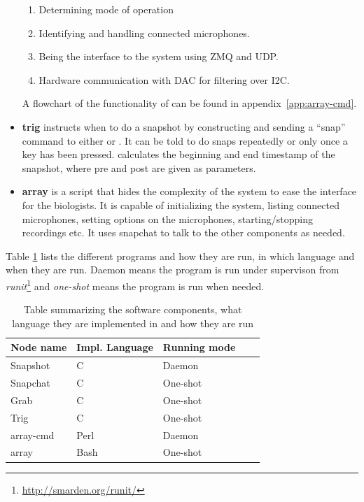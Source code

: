 \begin{itemize}
\begin{enumerate}
		\item Determining mode of operation
		\item Identifying and handling connected microphones.
		\item Being the interface to the system using ZMQ and UDP.
		\item Hardware communication with DAC for filtering over I2C.
	\end{enumerate} 
	
	A flowchart of the functionality of  can be found in appendix~\ref{app:array-cmd}. 
	
	\item \textbf{trig} instructs  when to do a snapshot by constructing and sending a ``snap'' command to either  or . It can be told to do snaps repeatedly or only once a key has been pressed.  calculates the beginning and end timestamp of the snapshot, where pre and post are given as parameters.
	
	\item \textbf{array} is a script that hides the complexity of the system to ease the interface for the biologists. It is capable of initializing the system, listing connected microphones, setting options on the microphones, starting/stopping recordings etc. It uses snapchat to talk to the other components as needed.

\end{itemize}


Table \ref{tab:existingsystem:summ} lists the different programs and how they are run, in which language and when they are run. Daemon means the program is run under supervison from \textit{runit}\footnote{\url{http://smarden.org/runit/}} and \textit{one-shot} means the program is run when needed.

\begin{table}[H]
\centering
\begin{tabularx}{\textwidth}{|X|X|X|X|X}
\hline
\textbf{Node name} & \textbf{Impl. Language} & \textbf{Running mode} \\ \hline
Snapshot           & C                       & Daemon                \\ \hline
Snapchat           & C                       & One-shot              \\ \hline
Grab               & C                       & One-shot              \\ \hline
Trig               & C                       & One-shot              \\ \hline
array-cmd          & Perl                    & Daemon                \\ \hline
array              & Bash                    & One-shot               \\ \hline
\end{tabularx}%
\caption{Table summarizing the software components, what language they are implemented in and how they are run}
\label{tab:existingsystem:summ}
\end{table}


